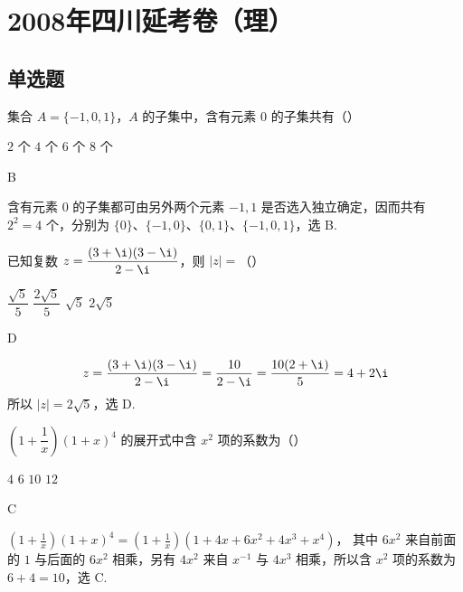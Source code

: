 \chapter{2008年四川延考卷（理）}

\section{单选题}

\begin{problem}
集合 \( A=\{-1,0,1\} \)，\(A\) 的子集中，含有元素 \(0\) 的子集共有（\quad）

\choices
    {\(2\) 个}
    {\(4\) 个}
    {\(6\) 个}
    {\(8\) 个}
\end{problem}

\begin{answer}
B
\end{answer}

\begin{solution}
含有元素 \(0\) 的子集都可由另外两个元素 \(-1,1\) 是否选入独立确定，因而共有
\(2^2=4\) 个，分别为 \(\{0\}\)、\(\{-1,0\}\)、\(\{0,1\}\)、\(\{-1,0,1\}\)，选 B.
\end{solution}

\begin{problem}
已知复数 \(z=\dfrac{(3+\i)(3-\i)}{2-\i}\)，则 \(|z|=\)（\quad）

\choices
    {\(\dfrac{\sqrt5}{5}\)}
    {\(\dfrac{2\sqrt5}{5}\)}
    {\(\sqrt5\)}
    {\(2\sqrt5\)}
\end{problem}

\begin{answer}
D
\end{answer}

\begin{solution}
\[z=\frac{(3+\i)(3-\i)}{2-\i}=\frac{10}{2-\i}=\frac{10(2+\i)}{5}=4+2\i\]
所以 \(|z|=2\sqrt5\)，选 D.
\end{solution}

\begin{problem}
\(\left(1+\dfrac{1}{x}\right)(1+x)^4\) 的展开式中含 \(x^2\) 项的系数为（\quad）

\choices
    {\(4\)}
    {\(6\)}
    {\(10\)}
    {\(12\)}
\end{problem}

\begin{answer}
C
\end{answer}

\begin{solution}
\(\left(1+\frac1x\right)(1+x)^4=\left(1+\frac1x\right)(1+4x+6x^2+4x^3+x^4)\)，
其中 \(6x^2\) 来自前面的 \(1\) 与后面的 \(6x^2\) 相乘，另有
\(4x^2\) 来自 \(x^{-1}\) 与 \(4x^3\) 相乘，所以含 \(x^2\) 项的系数为
\(6+4=10\)，选 C.
\end{solution}

